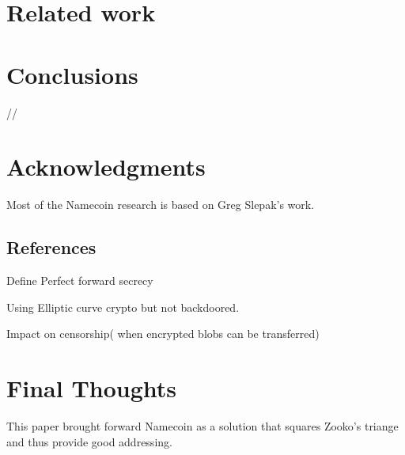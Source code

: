 \documentclass{vldb}
\begin{document}
\section{Related work}

\section{Conclusions}
//\balance

\section{Acknowledgments}
Most of the Namecoin research is based on Greg Slepak's work.


\subsection{References}

\begin{appendix}
Define Perfect forward secrecy

Using Elliptic curve crypto but not backdoored.

Impact on censorship( when encrypted blobs can be transferred)
\section{Final Thoughts}
This paper brought forward Namecoin as a solution that squares Zooko's triange and thus provide good addressing.
\end{appendix}
\end{document}
